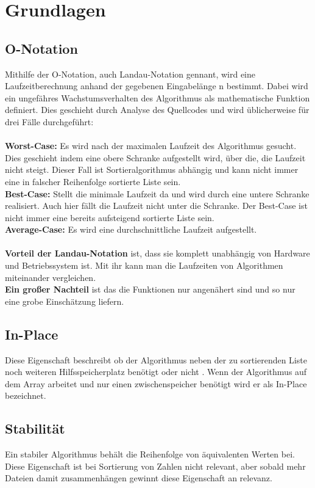 \documentclass{article}
\begin{document}
\section{Grundlagen}
\subsection{O-Notation}
Mithilfe der O-Notation, auch Landau-Notation gennant, wird eine Laufzeitberechnung anhand der gegebenen Eingabelänge n bestimmt. Dabei wird ein ungefähres Wachstumsverhalten des Algorithmus als mathematische Funktion definiert. Dies geschieht durch Analyse des Quellcodes und wird üblicherweise für drei Fälle durchgeführt: \cite{monster2009buch,Rehn2006Sortieralgorithmen}\\ \\
\textbf {Worst-Case:} Es wird nach der maximalen Laufzeit des Algorithmus gesucht. Dies geschieht indem eine obere Schranke aufgestellt wird, über die, die Laufzeit nicht steigt. Dieser Fall ist Sortieralgorithmus abhängig und kann nicht immer eine in falscher Reihenfolge sortierte Liste sein.   \\
\textbf {Best-Case:} Stellt die minimale Laufzeit da und wird durch eine untere Schranke realisiert. Auch hier fällt die Laufzeit nicht unter die Schranke. Der Best-Case ist nicht immer eine bereits aufsteigend sortierte Liste sein.\\
\textbf {Average-Case:} Es wird eine durchschnittliche Laufzeit aufgestellt. \\ \\
\textbf{Vorteil der Landau-Notation} ist, dass sie komplett unabhängig von Hardware und Betriebssystem ist. Mit ihr kann man die Laufzeiten von Algorithmen miteinander vergleichen.\\
\textbf{Ein großer Nachteil} ist das die Funktionen nur angenähert sind und so nur eine grobe Einschätzung liefern.%

\subsection{In-Place}
Diese Eigenschaft beschreibt ob der Algorithmus neben der zu sortierenden Liste noch weiteren Hilfsspeicherplatz benötigt oder nicht \cite{India2015Dataset}. Wenn der Algorithmus auf dem Array arbeitet und nur einen zwischenspeicher benötigt wird er als In-Place bezeichnet. 
\subsection{Stabilität}
Ein stabiler Algorithmus behält die Reihenfolge von äquivalenten Werten bei. Diese Eigenschaft ist bei Sortierung von Zahlen nicht relevant, aber sobald mehr Dateien damit zusammenhängen gewinnt diese Eigenschaft an relevanz. \cite{Rehn2006Sortieralgorithmen,India2015Dataset}
\end{document}
